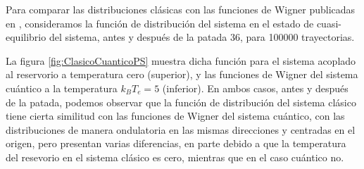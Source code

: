 \documentclass[letterpaper,12pt,oneside]{book}
\begin{document}
Para comparar las distribuciones clásicas con las funciones de Wigner publicadas en \cite{ArticuloPrado}, consideramos la función de distribución del sistema en el estado de cuasi-equilibrio del sistema, antes y después de la patada 36, para 100000 trayectorias.

La figura \ref{fig:ClasicoCuanticoPS} muestra dicha función para el sistema acoplado al reservorio a temperatura cero (superior), y las funciones de Wigner del sistema cuántico a la temperatura $k_BT_e = 5$  (inferior). En ambos casos, antes y después de la patada, podemos observar que la función de distribución del sistema clásico tiene cierta similitud con las funciones de Wigner del sistema cuántico, con las distribuciones de manera ondulatoria en las mismas direcciones y centradas en el origen, pero presentan varias diferencias, en parte debido a que la temperatura del resevorio en el sistema clásico es cero, mientras que en el caso cuántico no.
\end{document}
